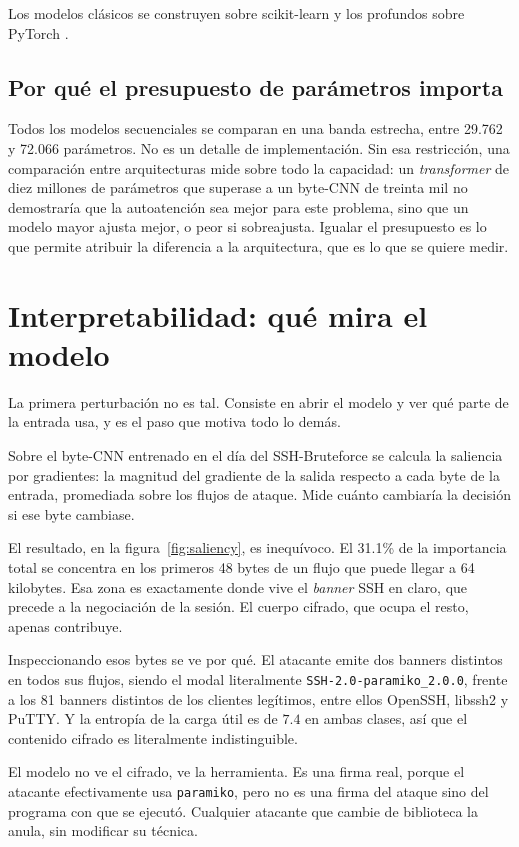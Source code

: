 Los modelos clásicos se construyen sobre scikit-learn \cite{Pedregosa2011} y los
profundos sobre PyTorch \cite{Paszke2019}.

\subsection*{Por qué el presupuesto de parámetros importa}

Todos los modelos secuenciales se comparan en una banda estrecha, entre 29.762 y
72.066 parámetros. No es un detalle de implementación. Sin esa restricción, una
comparación entre arquitecturas mide sobre todo la capacidad: un
\emph{transformer} de diez millones de parámetros que superase a un byte-CNN de
treinta mil no demostraría que la autoatención sea mejor para este problema,
sino que un modelo mayor ajusta mejor, o peor si sobreajusta. Igualar el
presupuesto es lo que permite atribuir la diferencia a la arquitectura, que es
lo que se quiere medir.

\section{Interpretabilidad: qué mira el modelo}
\label{sec:saliency}

La primera perturbación no es tal. Consiste en abrir el modelo y ver qué parte
de la entrada usa, y es el paso que motiva todo lo demás.

Sobre el byte-CNN entrenado en el día del SSH-Bruteforce se calcula la saliencia
por gradientes: la magnitud del gradiente de la salida respecto a cada byte de la
entrada, promediada sobre los flujos de ataque. Mide cuánto cambiaría la decisión
si ese byte cambiase.

El resultado, en la figura~\ref{fig:saliency}, es inequívoco. El 31.1\% de la
importancia total se concentra en los primeros 48 bytes de un flujo que puede
llegar a 64 kilobytes. Esa zona es exactamente donde vive el \emph{banner} SSH
en claro, que precede a la negociación de la sesión. El cuerpo cifrado, que
ocupa el resto, apenas contribuye.

Inspeccionando esos bytes se ve por qué. El atacante emite dos banners distintos
en todos sus flujos, siendo el modal literalmente
\texttt{SSH-2.0-paramiko\_2.0.0}, frente a los 81 banners distintos de los
clientes legítimos, entre ellos OpenSSH, libssh2 y PuTTY. Y la entropía de la
carga útil es de $7.4$ en ambas clases, así que el contenido cifrado es
literalmente indistinguible.

El modelo no ve el cifrado, ve la herramienta. Es una firma real, porque el
atacante efectivamente usa \texttt{paramiko}, pero no es una firma del ataque
sino del programa con que se ejecutó. Cualquier atacante que cambie de
biblioteca la anula, sin modificar su técnica.


